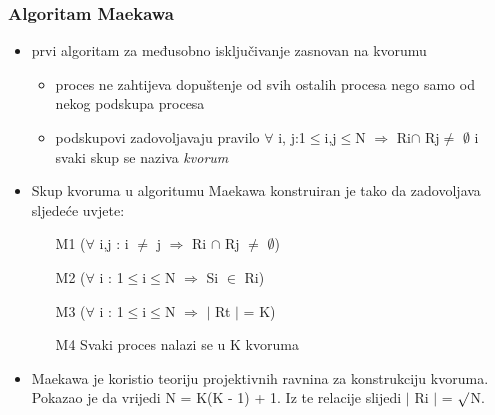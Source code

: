 \documentclass[11pt]{beamer}
\begin{document}
\begin{frame}
	\frametitle{Algoritam Maekawa}
	\begin{itemize}
		\item prvi algoritam za međusobno isključivanje zasnovan na kvorumu
		\begin{itemize}
			\item proces ne zahtijeva dopuštenje od svih ostalih procesa nego samo od nekog podskupa procesa
			\item podskupovi zadovoljavaju pravilo $\forall$ i, j:1$\leq$i,j$\leq$N $\Rightarrow$ Ri$\cap$ Rj$\neq$ $\emptyset$ i svaki skup se naziva \textit{kvorum}
		\end{itemize}
		\item Skup kvoruma u algoritumu Maekawa konstruiran je tako da zadovoljava sljedeće uvjete: 
		\begin{itemize}
			\item [M1] ($\forall$ i,j : i $\neq$ j $\Rightarrow$ Ri $\cap$ Rj $\neq$ $\emptyset$)
			\item [M2] ($\forall$ i : 1$\leq$i$\leq$N $\Rightarrow$ Si $\in$ Ri)
			\item [M3] ($\forall$ i : 1$\leq$i$\leq$N $\Rightarrow$ $\mid$ Rt $\mid$ = K)
			\item [M4] Svaki proces nalazi se u K kvoruma
		\end{itemize}
		
		\item Maekawa je koristio teoriju projektivnih ravnina za konstrukciju kvoruma. Pokazao je da vrijedi N = K(K - 1) + 1. Iz te relacije slijedi $\mid$ Ri $\mid$ =  $\surd$N.
		
	\end{itemize}
\end{frame}
\end{document}

